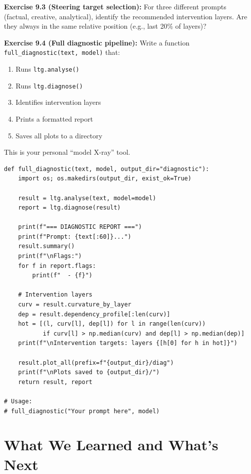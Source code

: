 \documentclass[11pt, twoside, openright]{memoir}
\begin{document}
\begin{tryit}
\textbf{Exercise 9.3 (Steering target selection):} For three different
prompts (factual, creative, analytical), identify the recommended
intervention layers. Are they always in the same relative position
(e.g., last 20\% of layers)?

\textbf{Exercise 9.4 (Full diagnostic pipeline):} Write a function
\texttt{full\_diagnostic(text, model)} that:
\begin{enumerate}[nosep]
\item Runs \texttt{ltg.analyse()}
\item Runs \texttt{ltg.diagnose()}
\item Identifies intervention layers
\item Prints a formatted report
\item Saves all plots to a directory
\end{enumerate}
This is your personal ``model X-ray'' tool.
\begin{lstlisting}
def full_diagnostic(text, model, output_dir="diagnostic"):
    import os; os.makedirs(output_dir, exist_ok=True)

    result = ltg.analyse(text, model=model)
    report = ltg.diagnose(result)

    print(f"=== DIAGNOSTIC REPORT ===")
    print(f"Prompt: {text[:60]}...")
    result.summary()
    print(f"\nFlags:")
    for f in report.flags:
        print(f"  - {f}")

    # Intervention layers
    curv = result.curvature_by_layer
    dep = result.dependency_profile[:len(curv)]
    hot = [(l, curv[l], dep[l]) for l in range(len(curv))
           if curv[l] > np.median(curv) and dep[l] > np.median(dep)]
    print(f"\nIntervention targets: layers {[h[0] for h in hot]}")

    result.plot_all(prefix=f"{output_dir}/diag")
    print(f"\nPlots saved to {output_dir}/")
    return result, report

# Usage:
# full_diagnostic("Your prompt here", model)
\end{lstlisting}
\end{tryit}


\chapter{What We Learned and What's Next}
\label{chap:conclusion}
\end{document}
